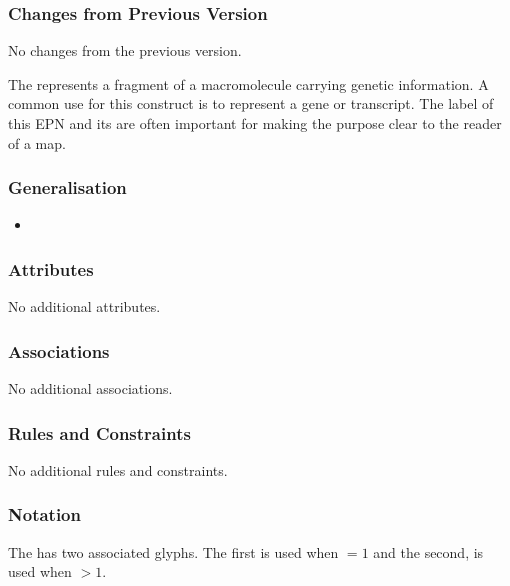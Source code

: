 \subsubsection{Changes from Previous Version}

No changes from the previous version.

\label{sec:techref:genetic}

The  represents a fragment of a
macromolecule carrying genetic information.  A common use for this
construct is to represent a gene or transcript.  The label of this EPN
and its  are often important for making the purpose
clear to the reader of a map.

\subsubsection{Generalisation}

\begin{itemize}
\item {}
\end{itemize}

\subsubsection{Attributes}

No additional attributes.

\subsubsection{Associations}

No additional associations.

\subsubsection{Rules and Constraints}

No additional rules and constraints.

\subsubsection{Notation}

The  has two associated glyphs. The
first  is used when
 $=1$ and the second,  is used when  $>1$.

